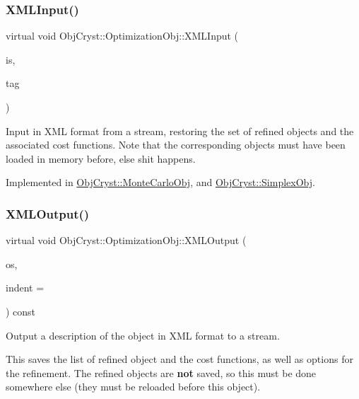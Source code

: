 \subsubsection{\texorpdfstring{XMLInput()}{XMLInput()}}
{\footnotesize\ttfamily virtual void Obj\+Cryst\+::\+Optimization\+Obj\+::\+X\+M\+L\+Input (\begin{DoxyParamCaption}\item[{istream \&}]{is,  }\item[{const \mbox{\hyperlink{class_obj_cryst_1_1_x_m_l_cryst_tag}{X\+M\+L\+Cryst\+Tag}} \&}]{tag }\end{DoxyParamCaption})\hspace{0.3cm}{\ttfamily [pure virtual]}}



Input in X\+ML format from a stream, restoring the set of refined objects and the associated cost functions. Note that the corresponding objects must have been loaded in memory before, else shit happens. 



Implemented in \mbox{\hyperlink{class_obj_cryst_1_1_monte_carlo_obj_a1b8be4dded36d1d2f882674decc5649c}{Obj\+Cryst\+::\+Monte\+Carlo\+Obj}}, and \mbox{\hyperlink{class_obj_cryst_1_1_simplex_obj_aeeb9fa38eb4e321724665045c39ad709}{Obj\+Cryst\+::\+Simplex\+Obj}}.

\mbox{\label{class_obj_cryst_1_1_optimization_obj_a6b7726159bb0d5dad1c7eebaee78f53a}} 
\subsubsection{\texorpdfstring{XMLOutput()}{XMLOutput()}}
{\footnotesize\ttfamily virtual void Obj\+Cryst\+::\+Optimization\+Obj\+::\+X\+M\+L\+Output (\begin{DoxyParamCaption}\item[{ostream \&}]{os,  }\item[{int}]{indent = {} }\end{DoxyParamCaption}) const\hspace{0.3cm}{\ttfamily [pure virtual]}}



Output a description of the object in X\+ML format to a stream. 

This saves the list of refined object and the cost functions, as well as options for the refinement. The refined objects are {\bfseries{not}} saved, so this must be done somewhere else (they must be reloaded before this object). 

